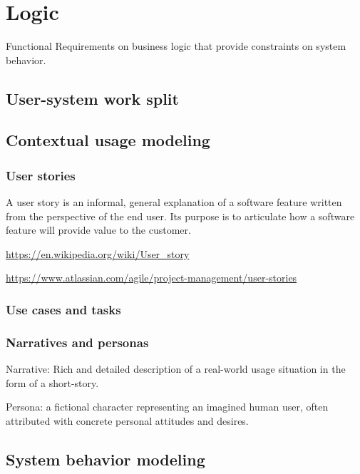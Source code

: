 
\chapter{Logic}%

Functional Requirements on business logic that provide constraints on system behavior.


\section{User-system work split}

\section{Contextual usage modeling}%

\subsection{User stories}

A user story is an informal, general explanation of a software feature written from the perspective of the end user. Its purpose is to articulate how a software feature will provide value to the customer.

\url{https://en.wikipedia.org/wiki/User_story}

\url{https://www.atlassian.com/agile/project-management/user-stories}

\subsection{Use cases and tasks}

\subsection{Narratives and personas}

Narrative: Rich and detailed description of a real-world usage situation in the form of a short-story.

Persona: a fictional character representing an imagined human user, often attributed with concrete personal attitudes and desires. 


\section{System behavior modeling}

